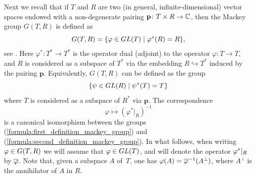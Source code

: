 \documentclass[11pt, a4paper]{article}
\begin{document}
Next we recall that if $T$ and $R$ are two (in general, infinite-dimensional) vector spaces endowed with a non-degenerate pairing $\mathbf{p}\colon T\times R \rightarrow \mathbb{C}$, then the Mackey group $ G(T,R)$ is defined as \begin{equation}\label{formula:first_definition_mackey_group}
	 G(T,R)=\{\varphi\in GL(T)\mid \varphi^*(R)= R\},
\end{equation}
see \cite{Mackey45}. Here $\varphi^*\colon T^*\rightarrow T^*$ is the operator dual (adjoint) to the operator $\varphi\colon T\rightarrow T$, and $R$ is considered as a subspace of $T^*$ via the embedding $R\hookrightarrow T^*$ induced by the pairing $\mathbf{p}$. Equivalently, $ G(T,R)$ can be defined as the group
\begin{equation}\label{formula:second_definition_mackey_group}
	\{\psi\in GL(R)\mid \psi^*(T)= T\}
\end{equation}
where $T$ is considered as a subspace of $R^*$ via $\mathbf{p}$. The correspondence $$\varphi\mapsto \left(\varphi^*|_R\right)^{-1}$$ is a canonical isomorphism between the groups (\ref{formula:first_definition_mackey_group}) and (\ref{formula:second_definition_mackey_group}). In what follows, when writing $\varphi \in  G(T,R)$ we will assume that $\varphi\in GL(T)$, and will denote the operator $\varphi^*|_R$ by $\overline{\varphi}$. Note that, given a subspace $A$ of~$T$, one has $\varphi(A)=\overline{\varphi}^{-1}(A^{\perp})$, where $A^{\perp}$ is the annihilator of $A$ in $R$.
\end{document}
